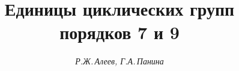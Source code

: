 

 


%  


 


\newcommand{\la}{\langle} 


\newcommand{\ra}{\rangle} 


\newcommand{\myza}{\Bbb Z[\alpha]} 


\newcommand{\myzx}{\Bbb Z\langle x\rangle} 


\newcommand{\Mod}{\operatorname{mod}} 


\newcommand{\tts}[1]{} 


 




 


\setcounter{page}{81} 












\author{\it Р.Ж.\,Алеев, Г.А.\,Панина} 




\title{Единицы циклических групп порядков 7 и 9} 


 


\date{} 




\pagestyle{plain} %


 




